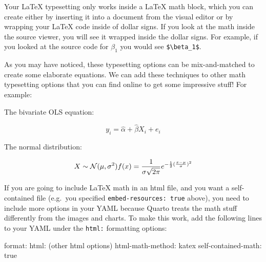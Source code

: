 \documentclass[
  letterpaper,
]{book}
\newenvironment{Shaded}{\begin{snugshade}}{\end{snugshade}}
\newcommand{\NormalTok}[1]{\textcolor[rgb]{0.00,0.23,0.31}{#1}}
\newcommand{\SpecialCharTok}[1]{\textcolor[rgb]{0.37,0.37,0.37}{#1}}
\begin{document}
Your LaTeX typesetting only works inside a LaTeX math block, which you
can create either by inserting it into a document from the visual editor
or by wrapping your LaTeX code inside of dollar signs. If you look at
the math inside the source viewer, you will see it wrapped inside the
dollar signs. For example, if you looked at the source code for
\(\beta_1\) you would see \texttt{\$\textbackslash{}beta\_1\$}.

As you may have noticed, these typesetting options can be
mix-and-matched to create some elaborate equations. We can add these
techniques to other math typesetting options that you can find online to
get some impressive stuff! For example:

The bivariate OLS equation:

\[y_i = \hat{\alpha} + \hat{\beta}X_i + e_i\]

The normal distribution:

\[X \sim \mathcal{N}(\mu,\sigma^2) \\ f(x)=\frac{1}{\sigma\sqrt{2\pi}}e^{-\frac{1}{2}(\frac{x-\mu}{\sigma})^{2}}\]

\begin{tcolorbox}[enhanced jigsaw, colframe=quarto-callout-tip-color-frame, breakable, arc=.35mm, bottomtitle=1mm, bottomrule=.15mm, colbacktitle=quarto-callout-tip-color!10!white, rightrule=.15mm, colback=white, opacityback=0, opacitybacktitle=0.6, coltitle=black, left=2mm, toptitle=1mm, toprule=.15mm, titlerule=0mm, leftrule=.75mm, title=\textcolor{quarto-callout-tip-color}{\faLightbulb}\hspace{0.5em}{May the Format Be With You: Equations make your YAML Grow}]

If you are going to include LaTeX math in an html file, and you want a
self-contained file (e.g.~you specified \texttt{embed-resources:\ true}
above), you need to include more options in your YAML because Quarto
treats the math stuff differently from the images and charts. To make
this work, add the following lines to your YAML under the \texttt{html:}
formatting options:

\begin{Shaded}
\begin{Highlighting}[]
\NormalTok{format}\SpecialCharTok{:}
\NormalTok{  html}\SpecialCharTok{:}
\NormalTok{    (other html options)}
\NormalTok{    html}\SpecialCharTok{{-}}\NormalTok{math}\SpecialCharTok{{-}}\NormalTok{method}\SpecialCharTok{:}\NormalTok{ katex}
\NormalTok{    self}\SpecialCharTok{{-}}\NormalTok{contained}\SpecialCharTok{{-}}\NormalTok{math}\SpecialCharTok{:}\NormalTok{ true }
\end{Highlighting}
\end{Shaded}

\end{tcolorbox}
\end{document}
